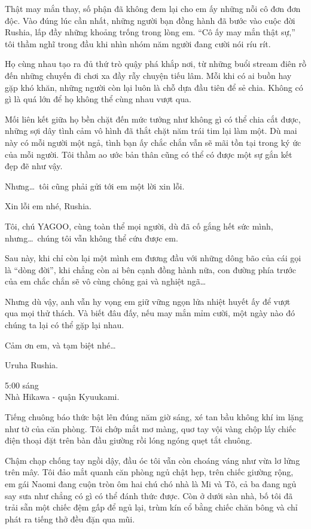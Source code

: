\documentclass[../main.tex]{subfiles}
\begin{document}
Thật may mắn thay, số phận đã không đem lại cho em ấy những nỗi cô đơn đơn độc. Vào đúng lúc cần nhất, những người bạn đồng hành đã bước vào cuộc đời Rushia, lấp đầy những khoảng trống trong lòng em. ``Cô ấy may mắn thật sự,'' tôi thầm nghĩ trong đầu khi nhìn nhóm năm người đang cười nói ríu rít.

Họ cùng nhau tạo ra đủ thứ trò quậy phá khắp nơi, từ những buổi stream điên rồ đến những chuyến đi chơi xa đầy rẫy chuyện tiếu lâm. Mỗi khi có ai buồn hay gặp khó khăn, những người còn lại luôn là chỗ dựa đầu tiên để sẻ chia. Không có gì là quá lớn để họ không thể cùng nhau vượt qua.

Mối liên kết giữa họ bền chặt đến mức tưởng như không gì có thể chia cắt được, những sợi dây tình cảm vô hình đã thắt chặt năm trái tim lại làm một. Dù mai này có mỗi người một ngả, tình bạn ấy chắc chắn vẫn sẽ mãi tồn tại trong ký ức của mỗi người. Tôi thầm ao ước bản thân cũng có thể có được một sự gắn kết đẹp đẽ như vậy.

Nhưng\dots\ tôi cũng phải gửi tới em một lời xin lỗi.

Xin lỗi em nhé, Rushia.

Tôi, chú YAGOO, cùng toàn thể mọi người, dù đã cố gắng hết sức mình, nhưng\dots\ chúng tôi vẫn không thể cứu được em.

Sau này, khi chỉ còn lại một mình em đương đầu với những dông bão của cái gọi là ``dòng đời'', khi chẳng còn ai bên cạnh đồng hành nữa, con đường phía trước của em chắc chắn sẽ vô cùng chông gai và nghiệt ngã\dots

Nhưng dù vậy, anh vẫn hy vọng em giữ vững ngọn lửa nhiệt huyết ấy để vượt qua mọi thử thách. Và biết đâu đấy, nếu may mắn mỉm cười, một ngày nào đó chúng ta lại có thể gặp lại nhau.

Cảm ơn em, và tạm biệt nhé\dots

Uruha Rushia.

\omk

\begin{center}
  5:00 sáng\\
  Nhà Hikawa - quận Kyuukami.
\end{center}

Tiếng chuông báo thức bật lên đúng năm giờ sáng, xé tan bầu không khí im lặng như tờ của căn phòng. Tôi chớp mắt mơ màng, quơ tay vội vàng chộp lấy chiếc điện thoại đặt trên bàn đầu giường rồi lóng ngóng quẹt tắt chuông.

Chậm chạp chống tay ngồi dậy, đầu óc tôi vẫn còn choáng váng như vừa lơ lửng trên mây. Tôi đảo mắt quanh căn phòng ngủ chật hẹp, trên chiếc giường rộng, em gái Naomi đang cuộn tròn ôm hai chú chó nhà là Mi và Tô, cả ba đang ngủ say sưa như chẳng có gì có thể đánh thức được. Còn ở dưới sàn nhà, bố tôi đã trải sẵn một chiếc đệm gấp để ngủ lại, trùm kín cổ bằng chiếc chăn bông và chỉ phát ra tiếng thở đều đặn qua mũi.
\end{document}

